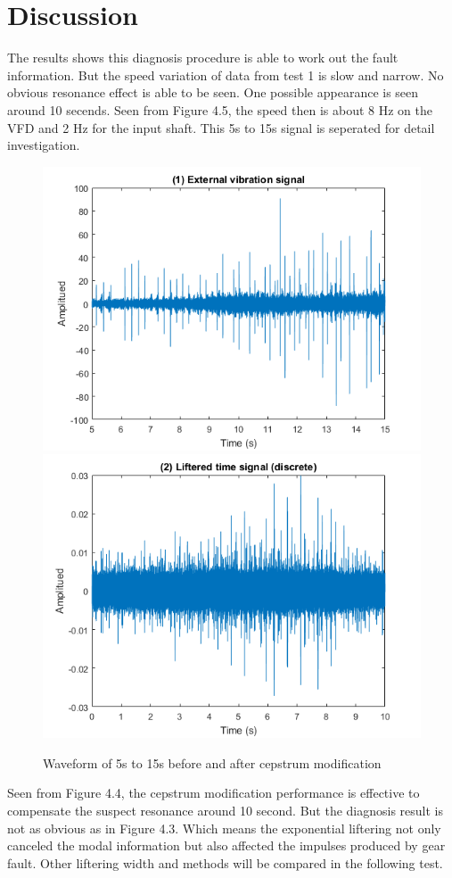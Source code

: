 \section{Discussion}

The results shows this diagnosis procedure is able to work out the fault information. But the speed variation of data from test 1 is slow and narrow. No obvious resonance effect is able to be seen. One possible appearance is seen around 10 secends. Seen from Figure 4.5, the speed then is about 8 Hz on the VFD and 2 Hz for the input shaft. This 5s to 15s signal is seperated for detail investigation. 

\begin{figure}[h]
	\centering
	\includegraphics[scale =0.48]{5t15}
	\includegraphics[scale =0.48]{5t15lift}
	\caption{Waveform of 5s to 15s before and after cepstrum modification}
	\label{5to15}
\end{figure}

Seen from Figure 4.4, the cepstrum modification performance is effective to compensate the suspect resonance around 10 second. But the diagnosis result is not as obvious as in Figure 4.3. Which means the exponential liftering not only canceled the modal information but also affected the impulses produced by gear fault. Other liftering width and methods will be compared in the following test.






